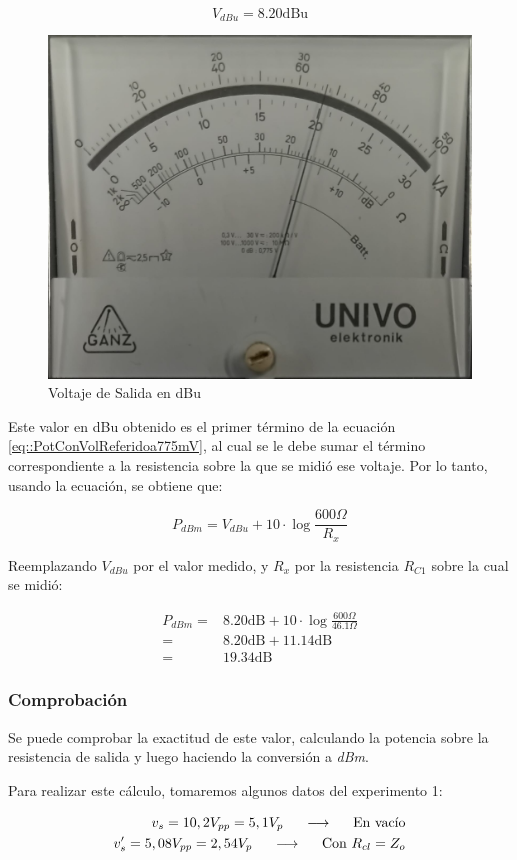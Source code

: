 \begin{equation}
    V_{dBu} = 8.20 \mathrm{dBu}
\end{equation}


\begin{figure}[H]
    \centering
    \includegraphics[width=0.45\linewidth]{Imagenes/dBuSal.jpeg}
    \caption{Voltaje de Salida en dBu}
    \label{fig:VoltajeDeSalidaDBu}
\end{figure}

Este valor en dBu obtenido es el primer término de la ecuación \ref{eq::PotConVolReferidoa775mV}, al cual se le debe sumar el término correspondiente a la resistencia sobre la que se midió ese voltaje. Por lo tanto, usando la ecuación, se obtiene que:

\begin{equation}
    P_{dBm} = V_{dBu} + 10\cdot\log{\frac{600\Omega}{R_x}}
\end{equation}

Reemplazando $V_{dBu}$ por el valor medido, y $R_x$ por la resistencia $R_{C1}$ sobre la cual se midió:

\begin{align}
    P_{dBm} =& 8.20 \mathrm{dB} + 10\cdot\log{\frac{600\Omega}{46.1\Omega}}
    \\ =& 8.20 \mathrm{dB} + 11.14 \mathrm{dB}
    \\ =& 19.34 \mathrm{dB}
\end{align}

\subsubsection{Comprobación}

Se puede comprobar la exactitud de este valor, calculando la potencia sobre la resistencia de salida y luego haciendo la conversión a \textit{dBm}. 

Para realizar este cálculo, tomaremos algunos datos del experimento 1: 

\begin{align*}
    v_s = 10,2 V_{pp} = 5,1 V_p
    \hspace{0.5cm}\longrightarrow \hspace{0.5cm}\text{En vacío}\\
    v_s'= 5,08 V_{pp} = 2,54 V_p 
    \hspace{0.5cm}\longrightarrow \hspace{0.5cm}\text{Con} ~R_{cl}=Z_o
\end{align*}

